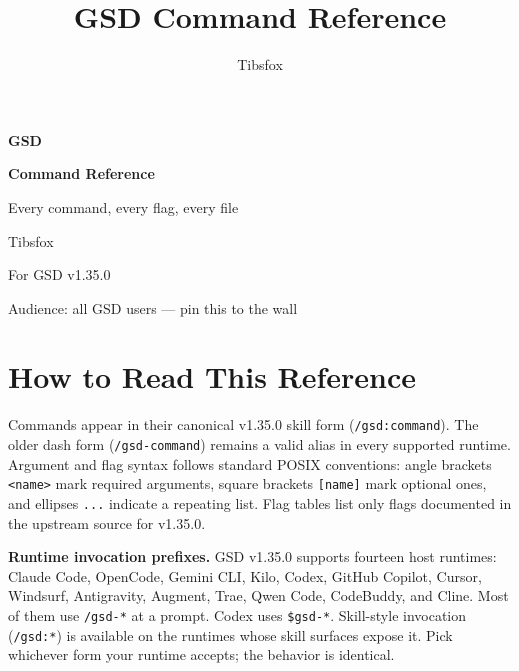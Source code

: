 \documentclass[10pt,letterpaper]{article}
\title{GSD Command Reference}
\author{Tibsfox}
\date{}
\let\chapter\section
\begin{document}
\begin{titlepage}
\centering
\vspace*{2cm}
{\headingfont\Huge\bfseries\color{gsdnavy} GSD\par}
\vspace{0.4cm}
{\headingfont\LARGE\bfseries\color{gsdnavy} Command Reference\par}
\vspace{0.8cm}
{\headingfont\large Every command, every flag, every file\par}
\vspace{3cm}
{\large Tibsfox\par}
\vspace{0.4cm}
{\small For GSD v1.35.0 \par}
\vspace{0.4cm}
{\small Audience: all GSD users — pin this to the wall\par}
\vfill
{\footnotesize \cclicense\par}
\end{titlepage}

\tableofcontents
\clearpage

\chapter*{How to Read This Reference}

Commands appear in their canonical v1.35.0 skill form (\texttt{/gsd:command}). The older dash form (\texttt{/gsd-command}) remains a valid alias in every supported runtime. Argument and flag syntax follows standard POSIX conventions: angle brackets \texttt{<name>} mark required arguments, square brackets \texttt{[name]} mark optional ones, and ellipses \texttt{...} indicate a repeating list. Flag tables list only flags documented in the upstream  source for v1.35.0.

\medskip
\noindent\textbf{Runtime invocation prefixes.} GSD v1.35.0 supports fourteen host runtimes: Claude Code, OpenCode, Gemini CLI, Kilo, Codex, GitHub Copilot, Cursor, Windsurf, Antigravity, Augment, Trae, Qwen Code, CodeBuddy, and Cline. Most of them use \texttt{/gsd-*} at a prompt. Codex uses \texttt{\$gsd-*}. Skill-style invocation (\texttt{/gsd:*}) is available on the runtimes whose skill surfaces expose it. Pick whichever form your runtime accepts; the behavior is identical.
\end{document}
